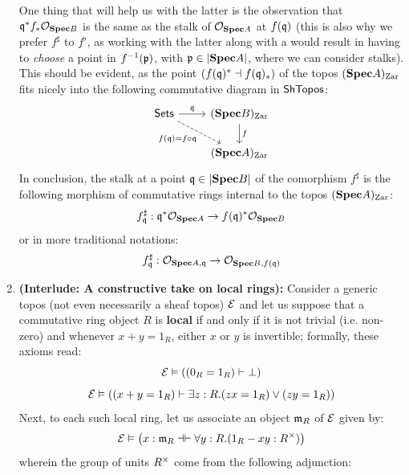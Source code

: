 \begin{remark}
\begin{enumerate}
                            One thing that will help us with the latter is the observation that $\mathfrak{q}^*f_*\mathcal{O}_{\mathbf{Spec} B}$ is the same as the stalk of $\mathcal{O}_{\mathbf{Spec} A}$ at $f(\mathfrak{q})$ (this is also why we prefer $f^{\sharp}$ to $f^{\flat}$, as working with the latter along with a would result in having to \textit{choose} a point in $f^{-1}(\mathfrak{p})$, with $\mathfrak{p} \in |\mathbf{Spec} A|$, where we can consider stalks). This should be evident, as the point $\left(f(\mathfrak{q})^* \dashv f(\mathfrak{q})_*\right)$ of the topos $(\mathbf{Spec} A)_{\mathrm{Zar}}$ fits nicely into the following commutative diagram in $\mathsf{Sh}\mathsf{Topos}$:
                                $$
                                    \begin{tikzcd}
                                    	\Sets & {(\Spec B)_{\Zar}} \\
                                    	& {(\Spec A)_{\Zar}}
                                    	\arrow["\q", from=1-1, to=1-2]
                                    	\arrow["f", from=1-2, to=2-2]
                                    	\arrow["{f(\q) = f \circ \q}"', dashed, from=1-1, to=2-2]
                                    \end{tikzcd}
                                $$
                            In conclusion, the stalk at a point $\mathfrak{q} \in |\mathbf{Spec} B|$ of the comorphism $f^{\sharp}$ is the following morphism of commutative rings internal to the topos $(\mathbf{Spec} A)_{\mathrm{Zar}}$:
                                $$f^{\sharp}_{\mathfrak{q}}: \mathfrak{q}^*\mathcal{O}_{\mathbf{Spec} A} \to f(\mathfrak{q})^*\mathcal{O}_{\mathbf{Spec} B}$$
                            or in more traditional notations:
                                $$f^{\sharp}_{\mathfrak{q}}: \mathcal{O}_{\mathbf{Spec} A, \mathfrak{q}} \to \mathcal{O}_{\mathbf{Spec} B, f(\mathfrak{q})}$$
                            \item \textbf{(Interlude: A constructive take on local rings):} Consider a generic topos (not even necessarily a sheaf topos) $\mathcal{E}$ and let us suppose that a commutative ring object $R$ is \textbf{local} if and only if it is not trivial (i.e. non-zero) and whenever $x + y = 1_R$, either $x$ or $y$ is invertible; formally, these axioms read:
                                $$\mathcal{E} \vDash \left( (0_R = 1_R) \vdash \bot \right)$$
                                $$\mathcal{E} \vDash \left( (x + y = 1_R) \vdash \exists z: R.  (zx = 1_R) \vee (zy = 1_R) \right)$$
                            Next, to each such local ring, let us associate an object $\mathfrak{m}_R$ of $\mathcal{E}$ given by:
                                $$\E \vDash \left(x: \m_R \dashv\vdash \forall y: R. (1_R - xy: R^{\x})\right)$$
                            wherein the group of units $R^{\x}$ come from the following adjunction:

\end{enumerate}
\end{remark}
